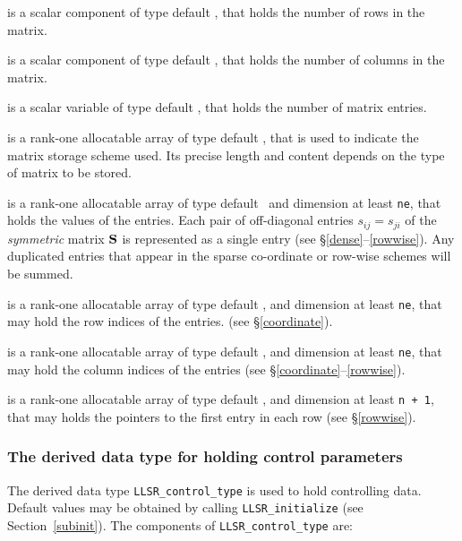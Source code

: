 \documentclass{galahad}
\newcommand{\packagename}{LLSR}
\begin{document}
\begin{description}

 is a scalar component of type default \integer,
that holds the number of rows in the matrix.

 is a scalar component of type default \integer,
that holds the number of columns in the matrix.

 is a scalar variable of type default \integer, that
holds the number of matrix entries.

 is a rank-one allocatable array of type default \character, that
is used to indicate the matrix storage scheme used. Its precise length and
content depends on the type of matrix to be stored.

 is a rank-one allocatable array of type default \realdp\,
and dimension at least {\tt ne}, that holds the values of the entries.
Each pair of off-diagonal entries $s_{ij} = s_{ji}$ of the {\em symmetric}
matrix ${\mathbf{S}}$ is represented as a single entry
(see \S\ref{dense}--\ref{rowwise}).
Any duplicated entries that appear in the sparse
co-ordinate or row-wise schemes will be summed.

 is a rank-one allocatable array of type default \integer,
and dimension at least {\tt ne}, that may hold the row indices of the entries.
(see \S\ref{coordinate}).

 is a rank-one allocatable array of type default \integer,
and dimension at least {\tt ne}, that may hold the column indices of the entries
(see \S\ref{coordinate}--\ref{rowwise}).

 is a rank-one allocatable array of type default \integer,
and dimension at least {\tt n + 1}, that may holds the pointers to
the first entry in each row (see \S\ref{rowwise}).

\end{description}


\subsubsection{The derived data type for holding control
 parameters}\label{typecontrol}
The derived data type
{\tt \packagename\_control\_type}
is used to hold controlling data. Default values may be obtained by calling
{\tt \packagename\_initialize}
(see Section~\ref{subinit}). The components of
{\tt \packagename\_control\_type}
are:
\end{document}

